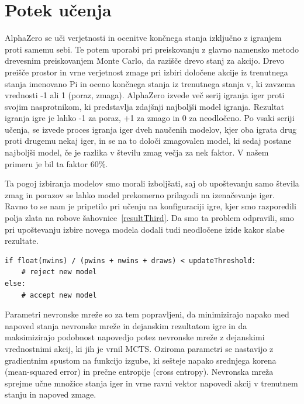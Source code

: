 \documentclass[a4paper, 12pt]{book}
\begin{document}
\section{Potek učenja}
\label{potekUcenja}
AlphaZero se uči verjetnosti in ocenitve končnega stanja izključno z igranjem proti samemu sebi. 
Te potem uporabi pri preiskovanju z glavno namensko metodo drevesnim preiskovanjem Monte Carlo, da razišče drevo stanj za akcijo.
Drevo preišče prostor in vrne verjetnost zmage pri izbiri določene akcije iz trenutnega stanja imenovano Pi in oceno končnega stanja iz trenutnega stanja v, ki zavzema vrednosti -1 ali 1 (poraz, zmaga).
AlphaZero izvede več serij igranja iger proti svojim nasprotnikom, ki predstavlja zdajšnji najboljši model igranja.
Rezultat igranja igre je lahko -1 za poraz, +1 za zmago in 0 za neodločeno.
Po vsaki seriji učenja, se izvede proces igranja iger dveh naučenih modelov, kjer oba igrata drug proti drugemu nekaj iger, in se na to določi zmagovalen model, ki sedaj postane najboljši model, če je razlika v številu zmag večja za nek faktor. V našem primeru je bil ta faktor 60\%.

Ta pogoj izbiranja modelov smo morali izboljšati, saj ob upoštevanju samo števila zmag in porazov se lahko model prekomerno prilagodi na izenačevanje iger.
Ravno to se nam je pripetilo pri učenju na konfiguraciji igre, kjer smo razporedili polja zlata na robove šahovnice~\ref{resultThird}.
Da smo ta problem odpravili, smo pri upoštevanju izbire novega modela dodali tudi neodločene izide kakor slabe rezultate.
\begin{verbatim}
if float(nwins) / (pwins + nwins + draws) < updateThreshold:
    # reject new model
else:
    # accept new model
\end{verbatim}

Parametri nevronske mreže so za tem popravljeni, da minimizirajo napako med napoved stanja nevronske mreže in dejanskim rezultatom igre in da maksimizirajo podobnost napovedjo potez nevronske mreže z dejanskimi vrednostnimi akcij, ki jih je vrnil MCTS. 
Oziroma parametri se nastavijo z gradientnim spustom na funkcijo izgube, ki sešteje napako srednjega korena (mean-squared error) in prečne entropije (cross entropy).
Nevronska mreža sprejme učne množice stanja iger in vrne ravni vektor napovedi akcij v trenutnem stanju in napoved zmage.
\end{document}
